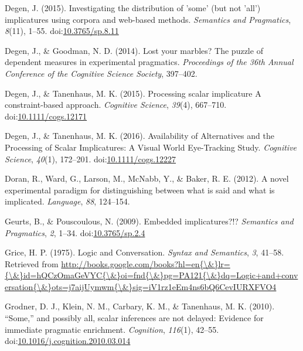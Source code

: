 \documentclass[floatsintext,man]{apa6}
\theoremstyle{definition}
\theoremstyle{definition}
\theoremstyle{definition}
\theoremstyle{remark}
\begin{document}
\hypertarget{ref-Degen2015}{}
Degen, J. (2015). Investigating the distribution of 'some' (but not
'all') implicatures using corpora and web-based methods. \emph{Semantics
and Pragmatics}, \emph{8}(11), 1--55.
doi:\href{https://doi.org/10.3765/sp.8.11}{10.3765/sp.8.11}

\hypertarget{ref-Degen2014}{}
Degen, J., \& Goodman, N. D. (2014). Lost your marbles? The puzzle of
dependent measures in experimental pragmatics. \emph{Proceedings of the
36th Annual Conference of the Cognitive Science Society}, 397--402.

\hypertarget{ref-DegenTanenhaus2015}{}
Degen, J., \& Tanenhaus, M. K. (2015). Processing scalar implicature A
constraint-based approach. \emph{Cognitive Science}, \emph{39}(4),
667--710.
doi:\href{https://doi.org/10.1111/cogs.12171}{10.1111/cogs.12171}

\hypertarget{ref-DegenTanenhaus2016}{}
Degen, J., \& Tanenhaus, M. K. (2016). Availability of Alternatives and
the Processing of Scalar Implicatures: A Visual World Eye-Tracking
Study. \emph{Cognitive Science}, \emph{40}(1), 172--201.
doi:\href{https://doi.org/10.1111/cogs.12227}{10.1111/cogs.12227}

\hypertarget{ref-Doran2012}{}
Doran, R., Ward, G., Larson, M., McNabb, Y., \& Baker, R. E. (2012). A
novel experimental paradigm for distinguishing between what is said and
what is implicated. \emph{Language}, \emph{88}, 124--154.

\hypertarget{ref-Geurts2009}{}
Geurts, B., \& Pouscoulous, N. (2009). Embedded implicatures?!?
\emph{Semantics and Pragmatics}, \emph{2}, 1--34.
doi:\href{https://doi.org/10.3765/sp.2.4}{10.3765/sp.2.4}

\hypertarget{ref-grice1975}{}
Grice, H. P. (1975). Logic and Conversation. \emph{Syntax and
Semantics}, \emph{3}, 41--58. Retrieved from
\href{http://books.google.com/books?hl=en\%7B/\&\%7Dlr=\%7B/\&\%7Did=hQCzOmaGeVYC\%7B/\&\%7Doi=fnd\%7B/\&\%7Dpg=PA121\%7B/\&\%7Ddq=Logic+and+conversation\%7B/\&\%7Dots=j7aijUymwm\%7B/\&\%7Dsig=iV1rz1eEm4ns6bQ6CevIURXFVO4}{http://books.google.com/books?hl=en\{\textbackslash{}\&\}lr=\{\textbackslash{}\&\}id=hQCzOmaGeVYC\{\textbackslash{}\&\}oi=fnd\{\textbackslash{}\&\}pg=PA121\{\textbackslash{}\&\}dq=Logic+and+conversation\{\textbackslash{}\&\}ots=j7aijUymwm\{\textbackslash{}\&\}sig=iV1rz1eEm4ns6bQ6CevIURXFVO4}

\hypertarget{ref-Grodner2010}{}
Grodner, D. J., Klein, N. M., Carbary, K. M., \& Tanenhaus, M. K.
(2010). ``Some,'' and possibly all, scalar inferences are not delayed:
Evidence for immediate pragmatic enrichment. \emph{Cognition},
\emph{116}(1), 42--55.
doi:\href{https://doi.org/10.1016/j.cognition.2010.03.014}{10.1016/j.cognition.2010.03.014}
\end{document}
